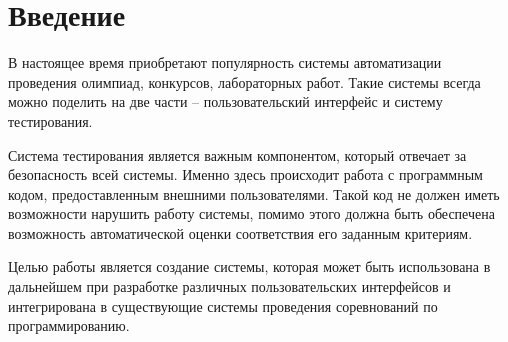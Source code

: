 \chapter*{Введение}
В настоящее время приобретают популярность системы автоматизации проведения
олимпиад, конкурсов, лабораторных работ. Такие системы всегда можно поделить
на две части -- пользовательский интерфейс и систему тестирования.

Система тестирования является важным компонентом,
который отвечает за безопасность всей системы. Именно здесь
происходит работа с программным кодом, предоставленным внешними
пользователями. Такой код не должен иметь возможности
нарушить работу системы, помимо этого должна быть обеспечена
возможность автоматической оценки соответствия его заданным
критериям.

Целью работы является создание системы,
которая может быть использована в дальнейшем
при разработке различных пользовательских интерфейсов
и интегрирована в существующие системы
проведения соревнований по программированию.
